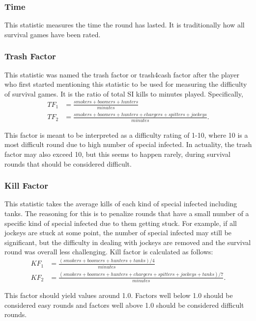 \subsubsection{Time}
This statistic measures the time the round has lasted. It is traditionally how all survival games have been rated.

\subsubsection{Trash Factor}
This statistic was named the trash factor or trash4cash factor after the player who first started mentioning this statistic to be used for measuring the difficulty of survival games. It is the ratio of total SI kills to minutes played. Specifically,
\begin{align}
TF_{1} &= \frac{smokers + boomers + hunters}{minutes} \\
TF_{2} &= \frac{smokers + boomers + hunters + chargers + spitters + jockeys}{minutes} \text{.}
\end{align}

This factor is meant to be interpreted as a difficulty rating of 1-10, where 10 is a most difficult round due to high number of special infected. In actuality, the trash factor may also exceed 10, but this seems to happen rarely, during survival rounds that should be considered difficult.

\subsubsection{Kill Factor}
This statistic takes the average kills of each kind of special infected including tanks. The reasoning for this is to penalize rounds that have a small number of a specific kind of special infected due to them getting stuck. For example, if all jockeys are stuck at some point, the number of special infected may still be significant, but the difficulty in dealing with jockeys are removed and the survival round was overall less challenging. Kill factor is calculated as follows:
\begin{align}
KF_{1} &= \frac{(smokers + boomers + hunters + tanks) / 4}{minutes} \\
KF_{2} &= \frac{(smokers + boomers + hunters + chargers + spitters + jockeys + tanks) / 7}{minutes} \text{.}
\end{align}

This factor should yield values around 1.0. Factors well below 1.0 should be considered easy rounds and factors well above 1.0 should be considered difficult rounds.

